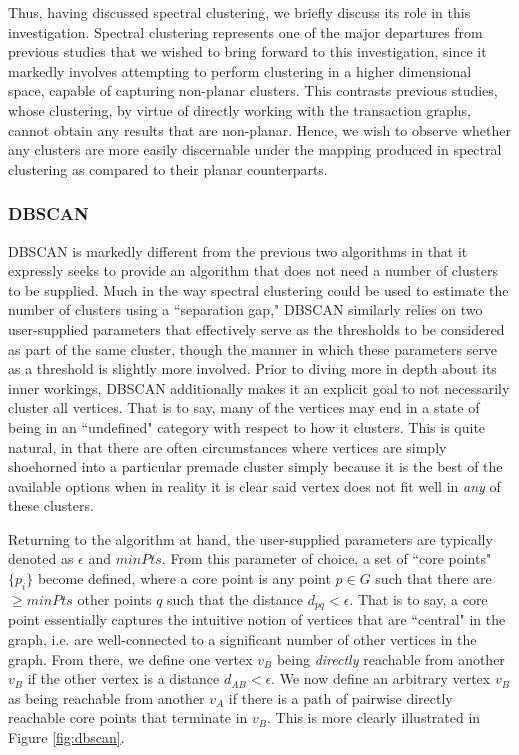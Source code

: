 \documentclass{article}
\begin{document}
Thus, having discussed spectral clustering, we briefly discuss its role in this investigation. Spectral clustering represents one of the major departures from previous studies that we wished to bring forward to this investigation, since it markedly involves attempting to perform clustering in a higher dimensional space, capable of capturing non-planar clusters. This contrasts previous studies, whose clustering, by virtue of directly working with the transaction graphs, cannot obtain any results that are non-planar. Hence, we wish to observe whether any clusters are more easily discernable under the mapping produced in spectral clustering as compared to their planar counterparts.

\subsubsection{DBSCAN}
DBSCAN is markedly different from the previous two algorithms in that it expressly seeks to provide an algorithm that does not need a number of clusters to be supplied. Much in the way spectral clustering could be used to estimate the number of clusters using a ``separation gap," DBSCAN similarly relies on two user-supplied parameters that effectively serve as the thresholds to be considered as part of the same cluster, though the manner in which these parameters serve as a threshold is slightly more involved. Prior to diving more in depth about its inner workings, DBSCAN additionally makes it an explicit goal to not necessarily cluster all vertices. That is to say, many of the vertices may end in a state of being in an ``undefined" category with respect to how it clusters. This is quite natural, in that there are often circumstances where vertices are simply shoehorned into a particular premade cluster simply because it is the best of the available options when in reality it is clear said vertex does not fit well in \textit{any} of these clusters.

Returning to the algorithm at hand, the user-supplied parameters are typically denoted as $\epsilon$ and $minPts$. From this parameter of choice, a set of ``core points" $\{p_i\}$ become defined, where a core point is any point $p\in G$ such that there are $\ge minPts$ other points $q$ such that the distance $d_{pq} < \epsilon$. That is to say, a core point essentially captures the intuitive notion of vertices that are ``central" in the graph, i.e. are well-connected to a significant number of other vertices in the graph. From there, we define one vertex $v_B$ being \textit{directly} reachable from another $v_B$ if the other vertex is a distance $d_{AB} < \epsilon$. We now define an arbitrary vertex $v_B$ as being reachable from another $v_A$ if there is a path of pairwise directly reachable core points that terminate in $v_B$. This is more clearly illustrated in Figure \ref{fig:dbscan}.
\end{document}
